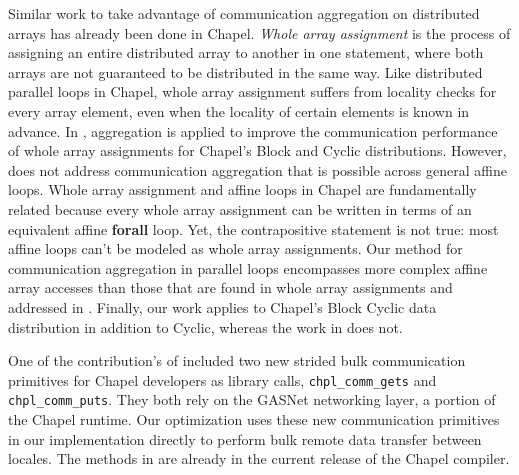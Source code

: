 Similar work to take advantage of communication aggregation on distributed arrays has already been done in Chapel. \textit{Whole array assignment} is the process of assigning an entire distributed array to another in one statement, where both arrays are not guaranteed to be distributed in the same way. Like distributed parallel loops in Chapel, whole array assignment suffers from locality checks for every array element, even when the locality of certain elements is known in advance. In \cite{sanz2012global}, aggregation is applied to improve the communication performance of whole array assignments for Chapel's Block and Cyclic distributions. However, \cite{sanz2012global} does not address communication aggregation that is possible across general affine loops. Whole array assignment and affine loops in Chapel are fundamentally related because every whole array assignment can be written in terms of an equivalent affine \textbf{forall} loop. Yet, the contrapositive statement is not true: most affine loops can't be modeled as whole array assignments. Our method for communication aggregation in parallel loops encompasses more complex affine array accesses than those that are found in whole array assignments and addressed in \cite{sanz2012global}. Finally, our work applies to Chapel's Block Cyclic data distribution in addition to Cyclic, whereas the work in \cite{sanz2012global} does not.  

One of the contribution's of \cite{sanz2012global} included two new strided bulk communication primitives for Chapel developers as library calls, \texttt{chpl\_comm\_gets} and \texttt{chpl\_comm\_puts}. They both rely on the GASNet networking layer, a portion of the Chapel runtime.  Our optimization uses these new communication primitives in our implementation directly to perform bulk remote data transfer between locales. The methods in \cite{sanz2012global} are already in the current release of the Chapel compiler. 

